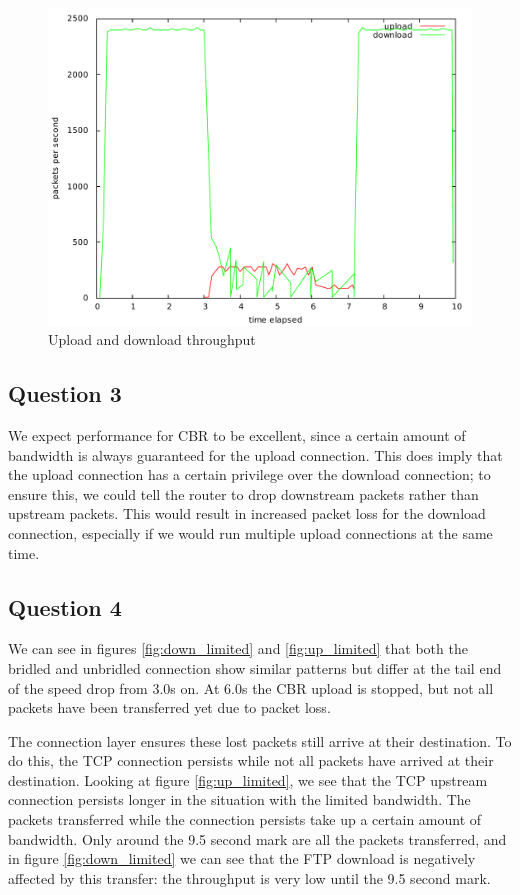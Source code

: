 \documentclass[10pt,a4paper]{article}
\begin{document}
\begin{figure}[p]
    \centering
    \includegraphics[width=\textwidth]{../part1/q2/plots/2.pdf}
    \caption{Upload and download throughput}
    \label{fig:combined1}
\end{figure}
\subsection{Question 3}

We expect performance for CBR to be excellent, since a certain amount
of bandwidth is always guaranteed for the upload connection. This does
imply that the upload connection has a certain privilege over the
download connection; to ensure this, we could tell the router to drop
downstream packets rather than upstream packets. This would result in
increased packet loss for the download connection, especially if we
would run multiple upload connections at the same time.

\subsection{Question 4}

We can see in figures \ref{fig:down_limited} and \ref{fig:up_limited} that
both the bridled and unbridled connection show similar patterns but
differ at the tail end of the speed drop from 3.0s on. At 6.0s the CBR
upload is stopped, but not all packets have been transferred yet due
to packet loss.

The connection layer ensures these lost packets still arrive at their
destination. To do this, the TCP connection persists while not all
packets have arrived at their destination. Looking at figure
\ref{fig:up_limited}, we see that the TCP upstream connection persists
longer in the situation with the limited bandwidth. The packets
transferred while the connection persists take up a certain amount of
bandwidth. Only around the 9.5 second mark are all the packets
transferred, and in figure \ref{fig:down_limited} we can see that the FTP
download is negatively affected by this transfer: the throughput is
very low until the 9.5 second mark.
\end{document}

